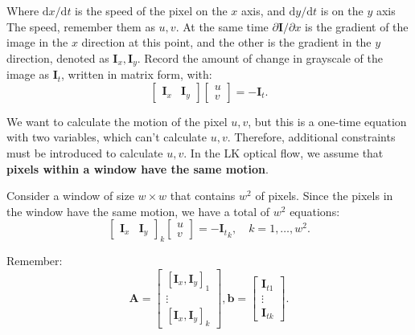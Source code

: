 Where $\mathrm{d}x / \mathrm{d}t$ is the speed of the pixel on the $x$ axis, and $\mathrm{d}y/\mathrm{d}t$ is on the $y$ axis The speed, remember them as $u, v$. At the same time $\partial \bm{I}/{\partial x}$ is the gradient of the image in the $x$ direction at this point, and the other is the gradient in the $y$ direction, denoted as $\bm{I} _x, \bm{I}_y$. Record the amount of change in grayscale of the image as $\bm{I}_t$, written in matrix form, with:
\begin{equation}
\left[ {\begin{array}{*{20}{c}}
{{ \bm{I}_x}}&{{ \bm{I}_y}}
\end{array}} \right]\left[ \begin{array}{l}
u\\
v
\end{array} \right] = - {\bm{I}_t}.
\end{equation}

We want to calculate the motion of the pixel $u, v$, but this is a one-time equation with two variables, which can't calculate $u,v$. Therefore, additional constraints must be introduced to calculate $u,v$. In the LK optical flow, we assume that \textbf{pixels within a window have the same motion}.

Consider a window of size $w \times w$ that contains $w^2$ of pixels. Since the pixels in the window have the same motion, we have a total of $w^2$ equations:
\begin{equation}
\left[ {\begin{array}{*{20}{c}}
{{ \bm{I}_x}}&{{ \bm{I}_y}}
\end{array}} \right]_k
\left[ \begin{array}{l}
u\\
v
\end{array} \right] = - {\bm{I}_t}_k, \quad k=1, \ldots, w^2.
\end{equation}

Remember:
\begin{equation}
\bm{A} = \left[ {\begin{array}{*{20}{c}}
{{{\left[ {{\bm{I}_x},{\bm{I}_y}} \right]}_1}}\\
\vdots \\
{{{\left[ {{\bm{I}_x},{\bm{I}_y}} \right]}_k}}
\end{array}} \right],\bm{b} = \left[ {\begin{array}{*{20}{c}}
{{ \bm{I}_{t1}}}\\
\vdots \\
{{ \bm{I}_{tk}}}
\end{array}} \right].
\end{equation}

